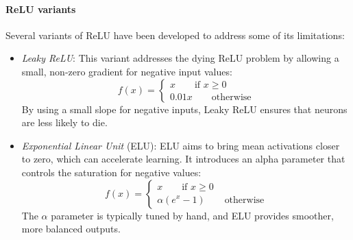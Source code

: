 \paragraph*{ReLU variants}
Several variants of ReLU have been developed to address some of its limitations:
\begin{itemize}
    \item \textit{Leaky ReLU}: This variant addresses the dying ReLU problem by allowing a small, non-zero gradient for negative input values:
        \[f(x)=\begin{cases}
            x \qquad \text{if } x \geq 0 \\
            0.01x \qquad \text{otherwise}
        \end{cases}\]
        By using a small slope for negative inputs, Leaky ReLU ensures that neurons are less likely to die.
    \item \textit{Exponential Linear Unit} (ELU): ELU aims to bring mean activations closer to zero, which can accelerate learning. 
        It introduces an alpha parameter that controls the saturation for negative values:
        \[f(x)=\begin{cases}
            x \qquad \text{if } x \geq 0 \\
            \alpha(e^x-1) \qquad \text{otherwise}
        \end{cases}\]
        The $\alpha$ parameter is typically tuned by hand, and ELU provides smoother, more balanced outputs.
\end{itemize}

